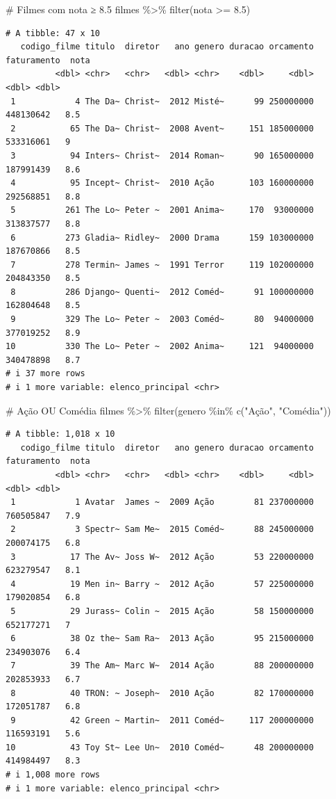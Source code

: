 \documentclass[
  letterpaper,
]{scrbook}
\newenvironment{Shaded}{\begin{snugshade}}{\end{snugshade}}
\newcommand{\CommentTok}[1]{\textcolor[rgb]{0.37,0.37,0.37}{#1}}
\newcommand{\FloatTok}[1]{\textcolor[rgb]{0.68,0.00,0.00}{#1}}
\newcommand{\FunctionTok}[1]{\textcolor[rgb]{0.28,0.35,0.67}{#1}}
\newcommand{\NormalTok}[1]{\textcolor[rgb]{0.00,0.23,0.31}{#1}}
\newcommand{\SpecialCharTok}[1]{\textcolor[rgb]{0.37,0.37,0.37}{#1}}
\newcommand{\StringTok}[1]{\textcolor[rgb]{0.13,0.47,0.30}{#1}}
\begin{document}
\begin{Shaded}
\begin{Highlighting}[]
\CommentTok{\# Filmes com nota ≥ 8.5}
\NormalTok{filmes }\SpecialCharTok{\%\textgreater{}\%} \FunctionTok{filter}\NormalTok{(nota }\SpecialCharTok{\textgreater{}=} \FloatTok{8.5}\NormalTok{)}
\end{Highlighting}
\end{Shaded}

\begin{verbatim}
# A tibble: 47 x 10
   codigo_filme titulo  diretor   ano genero duracao orcamento faturamento  nota
          <dbl> <chr>   <chr>   <dbl> <chr>    <dbl>     <dbl>       <dbl> <dbl>
 1            4 The Da~ Christ~  2012 Misté~      99 250000000   448130642   8.5
 2           65 The Da~ Christ~  2008 Avent~     151 185000000   533316061   9  
 3           94 Inters~ Christ~  2014 Roman~      90 165000000   187991439   8.6
 4           95 Incept~ Christ~  2010 Ação       103 160000000   292568851   8.8
 5          261 The Lo~ Peter ~  2001 Anima~     170  93000000   313837577   8.8
 6          273 Gladia~ Ridley~  2000 Drama      159 103000000   187670866   8.5
 7          278 Termin~ James ~  1991 Terror     119 102000000   204843350   8.5
 8          286 Django~ Quenti~  2012 Coméd~      91 100000000   162804648   8.5
 9          329 The Lo~ Peter ~  2003 Coméd~      80  94000000   377019252   8.9
10          330 The Lo~ Peter ~  2002 Anima~     121  94000000   340478898   8.7
# i 37 more rows
# i 1 more variable: elenco_principal <chr>
\end{verbatim}

\begin{Shaded}
\begin{Highlighting}[]
\CommentTok{\# Ação OU Comédia}
\NormalTok{filmes }\SpecialCharTok{\%\textgreater{}\%} \FunctionTok{filter}\NormalTok{(genero }\SpecialCharTok{\%in\%} \FunctionTok{c}\NormalTok{(}\StringTok{"Ação"}\NormalTok{, }\StringTok{"Comédia"}\NormalTok{))}
\end{Highlighting}
\end{Shaded}

\begin{verbatim}
# A tibble: 1,018 x 10
   codigo_filme titulo  diretor   ano genero duracao orcamento faturamento  nota
          <dbl> <chr>   <chr>   <dbl> <chr>    <dbl>     <dbl>       <dbl> <dbl>
 1            1 Avatar  James ~  2009 Ação        81 237000000   760505847   7.9
 2            3 Spectr~ Sam Me~  2015 Coméd~      88 245000000   200074175   6.8
 3           17 The Av~ Joss W~  2012 Ação        53 220000000   623279547   8.1
 4           19 Men in~ Barry ~  2012 Ação        57 225000000   179020854   6.8
 5           29 Jurass~ Colin ~  2015 Ação        58 150000000   652177271   7  
 6           38 Oz the~ Sam Ra~  2013 Ação        95 215000000   234903076   6.4
 7           39 The Am~ Marc W~  2014 Ação        88 200000000   202853933   6.7
 8           40 TRON: ~ Joseph~  2010 Ação        82 170000000   172051787   6.8
 9           42 Green ~ Martin~  2011 Coméd~     117 200000000   116593191   5.6
10           43 Toy St~ Lee Un~  2010 Coméd~      48 200000000   414984497   8.3
# i 1,008 more rows
# i 1 more variable: elenco_principal <chr>
\end{verbatim}
\end{document}
